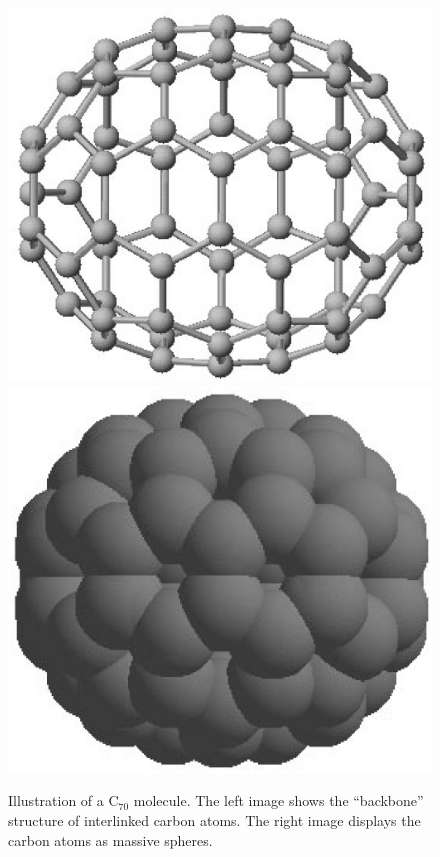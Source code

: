 \documentclass[12pt,aps,floatfix,amsmath,amssymb,showpacs,nofootinbib]{revtex4-2}
\begin{document}
\begin{figure}
\begin{center}
\includegraphics[scale=.21]{c70-n.eps} 
\includegraphics[scale=.20]{c70-full-n.eps}
\end{center}
\caption[Illustration of a C$_{70}$ molecule]{\label{fig:c70}
  Illustration of a C$_{70}$ molecule. The left image shows the
  ``backbone'' structure of interlinked carbon atoms. The right image
  displays the carbon atoms as massive spheres. }
\end{figure}
\end{document}
